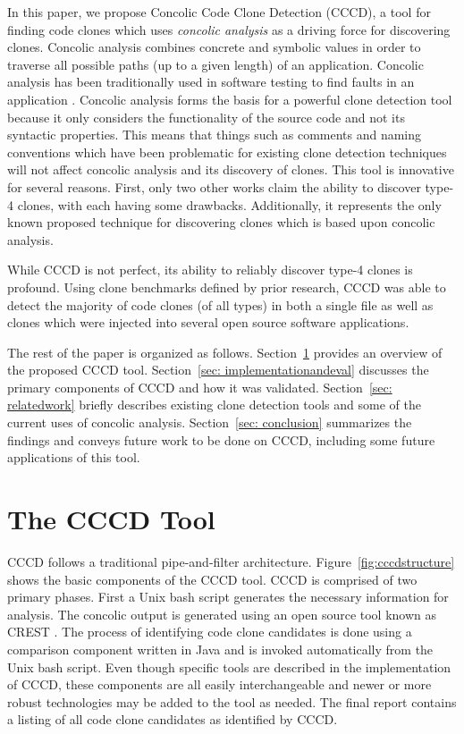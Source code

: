\documentclass[conference]{IEEEtran}
\begin{document}
In this paper, we propose Concolic Code Clone Detection (CCCD), a tool for finding code clones which uses \emph{concolic analysis} as a driving force for discovering clones. Concolic analysis combines concrete and symbolic values in order to traverse all possible paths (up to a given length) of an application. Concolic analysis has been traditionally used in software testing to find faults in an application \cite{Kim:2012:IAC:2337223.2337373}. Concolic analysis forms the basis for a powerful clone detection tool because it only considers the functionality of the source code and not its syntactic properties. This means that things such as comments and naming conventions which have been problematic for existing clone detection techniques will not affect concolic analysis and its discovery of clones. This tool is innovative for several reasons. First, only two other works claim the ability to discover type-4 clones, with each having some drawbacks.   Additionally, it represents the only known proposed technique for discovering clones which is based upon concolic analysis.

While CCCD is not perfect, its ability to reliably discover type-4 clones is profound. Using clone benchmarks defined by prior research, CCCD was able to detect the majority of code clones (of all types) in both a single file as well as clones which were injected into several open source software applications.


The rest of the paper is organized as follows. Section~\ref{sec: CCCD_tool} provides an overview of the proposed CCCD tool. Section~\ref{sec: implementationandeval} discusses the primary components of CCCD and how it was validated. Section~\ref{sec: relatedwork} briefly describes existing clone detection tools and some of the current uses of concolic analysis. Section~\ref{sec: conclusion} summarizes the findings and conveys future work to be done on CCCD, including some future applications of this tool.

\section{The CCCD Tool}
\label{sec: CCCD_tool}
CCCD follows a traditional pipe-and-filter architecture. Figure~\ref{fig:cccdstructure} shows the basic components of the CCCD tool. CCCD is comprised of two primary phases. First a Unix bash script generates the necessary information for analysis. The concolic output is generated using an open source tool known as CREST \cite{Burnim:2008:HSD:1642931.1642995}. The process of identifying code clone candidates is done using a comparison component written in Java and is invoked automatically from the Unix bash script. Even though specific tools are described in the implementation of CCCD, these components are all easily interchangeable and newer or more robust technologies may be added to the tool as needed. The final report contains a listing of all code clone candidates as identified by CCCD.
\end{document}
